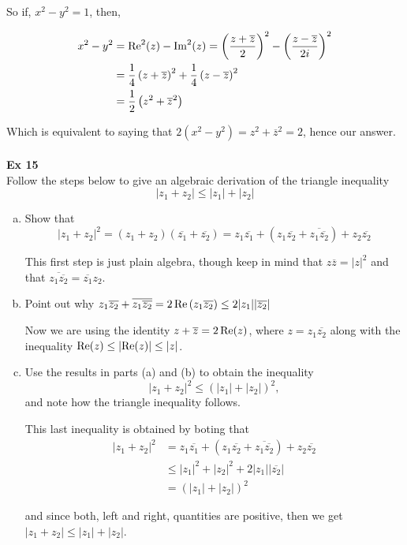 So if, $x^2 - y^2 = 1$, then,

\begin{align*}
x^2 - y^2 &= \operatorname{Re}^2 (z) - \operatorname{Im}^2 (z) = \left(\frac{z+\overline{z}}{2}\right)^2 - \left(\frac{z-\overline{z}}{2i}\right)^2 \\
&= \frac{1}{4}\left(z+\overline{z}\right)^2 + \frac{1}{4}\left(z-\overline{z}\right)^2 \\
&= \frac{1}{2} \left(z^2 + \overline{z}^2\right)
\end{align*}

Which is equivalent to saying that $2\left(x^2 - y^2\right) = z^2 + \overline{z}^2 = 2$, hence our answer.
\\~\\



\textbf{Ex 15}
\\

Follow the steps below to give an algebraic derivation of the triangle inequality
$$
\left| z_1 + z_2 \right| \leq |z_1| + |z_2|
$$

\begin{enumerate}[(a)]
\item Show that
$$
\left| z_1 + z_2 \right|^2 =
\left(z_1 + z_2\right)\left(\overline{z_1} + \overline{z_2}\right) =
z_1 \overline{z_1} + \left(z_1 \overline{z_2} + \overline{z_1 \overline{z_2}}\right) + z_2 \overline{z_2}
$$

This first step is just plain algebra, though keep in mind that $z\overline{z} = |z|^2$ and that
$\overline{z_1 \overline{z_2}} = \overline{z_1} z_2$.

\item Point out why $z_1 \overline{z_2} + \overline{z_1 \overline{z_2}} = 2 \operatorname{Re}\left(z_1 \overline{z_2}\right) \leq 2|z_1| |\overline{z_2}|$

Now we are using the identity $z+\overline{z} = 2\operatorname{Re}(z)$, where $z = z_1 \overline{z_2}$
along with the inequality $\operatorname{Re}(z) \leq \left|\operatorname{Re}(z)\right| \leq |z|$.

\item Use the results in parts (a) and (b) to obtain the inequality
$$
\left| z_1 + z_2 \right|^2 \leq \left( |z_1| + |z_2| \right)^2,
$$
and note how the triangle inequality follows.

This last inequality is obtained by boting that
\begin{align*}
\left| z_1 + z_2 \right|^2 &=
    z_1 \overline{z_1} + \left(z_1 \overline{z_2} + \overline{z_1 \overline{z_2}}\right) + z_2 \overline{z_2} \\
&\leq |z_1|^2 + |z_2|^2 + 2|z_1| |\overline{z_2}| \\
&= \left( |z_1| + |z_2| \right)^2
\end{align*}

and since both, left and right, quantities are positive, then we get $\left| z_1 + z_2 \right| \leq |z_1| + |z_2|$.

\end{enumerate}

